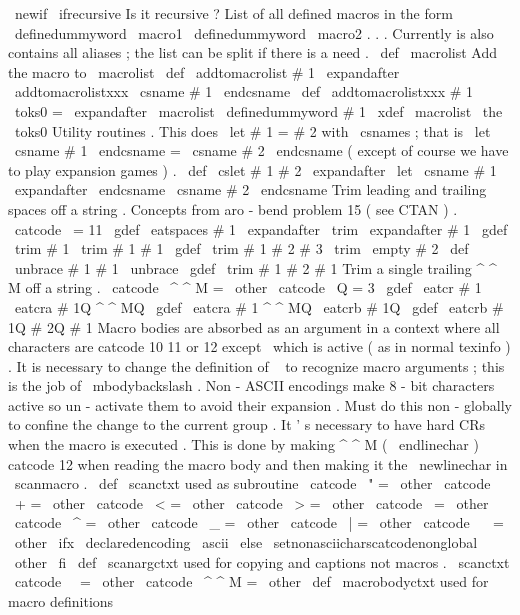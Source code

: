 {{{{\
newif
\
ifrecursive
%
Is
it
recursive
?
%
List
of
all
defined
macros
in
the
form
%
\
definedummyword
\
macro1
\
definedummyword
\
macro2
.
.
.
%
Currently
is
also
contains
all
aliases
;
the
list
can
be
split
%
if
there
is
a
need
.
\
def
\
macrolist
{
}
%
Add
the
macro
to
\
macrolist
\
def
\
addtomacrolist
#
1
{
\
expandafter
\
addtomacrolistxxx
\
csname
#
1
\
endcsname
}
\
def
\
addtomacrolistxxx
#
1
{
%
\
toks0
=
\
expandafter
{
\
macrolist
\
definedummyword
#
1
}
%
\
xdef
\
macrolist
{
\
the
\
toks0
}
%
}
%
Utility
routines
.
%
This
does
\
let
#
1
=
#
2
with
\
csnames
;
that
is
%
\
let
\
csname
#
1
\
endcsname
=
\
csname
#
2
\
endcsname
%
(
except
of
course
we
have
to
play
expansion
games
)
.
%
\
def
\
cslet
#
1
#
2
{
%
\
expandafter
\
let
\
csname
#
1
\
expandafter
\
endcsname
\
csname
#
2
\
endcsname
}
%
Trim
leading
and
trailing
spaces
off
a
string
.
%
Concepts
from
aro
-
bend
problem
15
(
see
CTAN
)
.
{
\
catcode
\
=
11
\
gdef
\
eatspaces
#
1
{
\
expandafter
\
trim
\
expandafter
{
#
1
}
}
\
gdef
\
trim
#
1
{
\
trim
#
1
#
1
}
\
gdef
\
trim
#
1
#
2
#
3
{
\
trim
\
empty
#
2
}
\
def
\
unbrace
#
1
{
#
1
}
\
unbrace
{
\
gdef
\
trim
#
1
}
#
2
{
#
1
}
}
%
Trim
a
single
trailing
^
^
M
off
a
string
.
{
\
catcode
\
^
^
M
=
\
other
\
catcode
\
Q
=
3
%
\
gdef
\
eatcr
#
1
{
\
eatcra
#
1Q
^
^
MQ
}
%
\
gdef
\
eatcra
#
1
^
^
MQ
{
\
eatcrb
#
1Q
}
%
\
gdef
\
eatcrb
#
1Q
#
2Q
{
#
1
}
%
}
%
Macro
bodies
are
absorbed
as
an
argument
in
a
context
where
%
all
characters
are
catcode
10
11
or
12
except
\
which
is
active
%
(
as
in
normal
texinfo
)
.
It
is
necessary
to
change
the
definition
of
\
%
to
recognize
macro
arguments
;
this
is
the
job
of
\
mbodybackslash
.
%
%
Non
-
ASCII
encodings
make
8
-
bit
characters
active
so
un
-
activate
%
them
to
avoid
their
expansion
.
Must
do
this
non
-
globally
to
%
confine
the
change
to
the
current
group
.
%
%
It
'
s
necessary
to
have
hard
CRs
when
the
macro
is
executed
.
This
is
%
done
by
making
^
^
M
(
\
endlinechar
)
catcode
12
when
reading
the
macro
%
body
and
then
making
it
the
\
newlinechar
in
\
scanmacro
.
%
\
def
\
scanctxt
{
%
used
as
subroutine
\
catcode
\
"
=
\
other
\
catcode
\
+
=
\
other
\
catcode
\
<
=
\
other
\
catcode
\
>
=
\
other
\
catcode
\
=
\
other
\
catcode
\
^
=
\
other
\
catcode
\
_
=
\
other
\
catcode
\
|
=
\
other
\
catcode
\
~
=
\
other
\
ifx
\
declaredencoding
\
ascii
\
else
\
setnonasciicharscatcodenonglobal
\
other
\
fi
}
\
def
\
scanargctxt
{
%
used
for
copying
and
captions
not
macros
.
\
scanctxt
\
catcode
\
\
=
\
other
\
catcode
\
^
^
M
=
\
other
}
\
def
\
macrobodyctxt
{
%
used
for
macro
definitions
\
}}}}}
